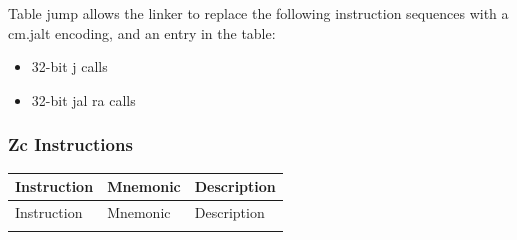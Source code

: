\documentclass[main\_\_EN.tex]{subfiles}
\begin{document}
Table jump allows the linker to replace the following instruction sequences with a cm.jalt encoding, and an entry in the table:
\begin{itemize}
    \item 32-bit j calls
    \item 32-bit jal ra calls
\end{itemize}

\subsubsection{Zc Instructions}
\label{sec:riscvcpu-zc-insn-descr}

\begin{longtable}{ | p{2.0cm} | p{4.0cm} |  p{10.0cm} | }
\hline\rowcolor{lightgray}
Instruction & Mnemonic & Description  \\ \hline
\endfirsthead
\hline
\rowcolor{lightgray}
Instruction & Mnemonic & Description  \\ \hline
\hline
\endhead
\endfoot


\end{longtable}
\end{document}
